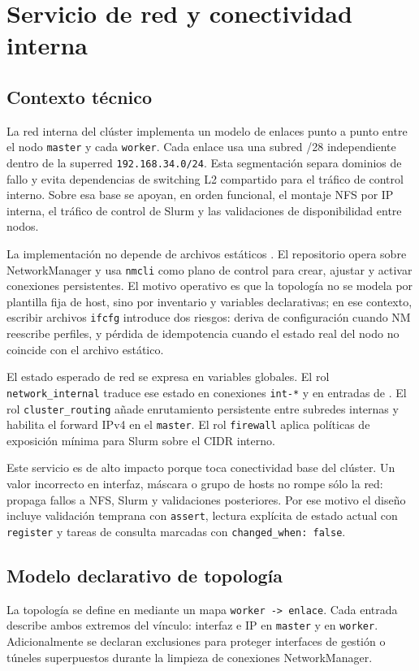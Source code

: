 \section{Servicio de red y conectividad interna}

\subsection{Contexto técnico}
La red interna del clúster implementa un modelo de enlaces punto a punto entre el nodo \texttt{master} y cada \texttt{worker}. Cada enlace usa una subred /28 independiente dentro de la superred \texttt{192.168.34.0/24}. Esta segmentación separa dominios de fallo y evita dependencias de switching L2 compartido para el tráfico de control interno. Sobre esa base se apoyan, en orden funcional, el montaje NFS por IP interna, el tráfico de control de Slurm y las validaciones de disponibilidad entre nodos.

La implementación no depende de archivos estáticos . El repositorio opera sobre NetworkManager y usa \texttt{nmcli} como plano de control para crear, ajustar y activar conexiones persistentes. El motivo operativo es que la topología no se modela por plantilla fija de host, sino por inventario y variables declarativas; en ese contexto, escribir archivos \texttt{ifcfg} introduce dos riesgos: deriva de configuración cuando NM reescribe perfiles, y pérdida de idempotencia cuando el estado real del nodo no coincide con el archivo estático.

El estado esperado de red se expresa en variables globales. El rol \texttt{network\_internal} traduce ese estado en conexiones \texttt{int-*} y en entradas de . El rol \texttt{cluster\_routing} añade enrutamiento persistente entre subredes internas y habilita el forward IPv4 en el \texttt{master}. El rol \texttt{firewall} aplica políticas de exposición mínima para Slurm sobre el CIDR interno.

Este servicio es de alto impacto porque toca conectividad base del clúster. Un valor incorrecto en interfaz, máscara o grupo de hosts no rompe sólo la red: propaga fallos a NFS, Slurm y validaciones posteriores. Por ese motivo el diseño incluye validación temprana con \texttt{assert}, lectura explícita de estado actual con \texttt{register} y tareas de consulta marcadas con \texttt{changed\_when: false}.

\subsection{Modelo declarativo de topología}
La topología se define en  mediante un mapa \texttt{worker -> enlace}. Cada entrada describe ambos extremos del vínculo: interfaz e IP en \texttt{master} y en \texttt{worker}. Adicionalmente se declaran exclusiones para proteger interfaces de gestión o túneles superpuestos durante la limpieza de conexiones NetworkManager.


